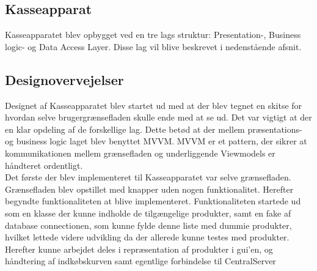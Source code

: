 \subsection{Kasseapparat}

Kasseapparatet blev opbygget ved en tre lags struktur: Presentation-, Business logic- og Data Access Layer. Disse lag vil blive beskrevet i nedenstående afsnit.

\subsection{Designovervejelser}
Designet af Kasseapparatet blev startet ud med at der blev tegnet en skitse for hvordan selve brugergrænsefladen skulle ende med at se ud.
Det var vigtigt at der en klar opdeling af de forskellige lag. Dette betød at der mellem præsentations- og business logic laget blev benyttet MVVM. MVVM er et pattern, der sikrer at kommunikationen mellem grænsefladen og underliggende Viewmodels er håndteret ordentligt. \\
Det første der blev implementeret til Kasseapparatet var selve grænsefladen. Grænsefladen blev opstillet med knapper uden nogen funktionalitet. Herefter begyndte funktionaliteten at blive implementeret. Funktionaliteten startede ud som en klasse der kunne indholde de tilgængelige produkter, samt en fake af database connectionen, som kunne fylde denne liste med dummie produkter, hvilket lettede videre udvikling da der allerede kunne testes med produkter. Herefter kunne arbejdet deles i repræsentation af produkter i gui'en, og håndtering af indkøbskurven samt egentlige forbindelse til CentralServer





